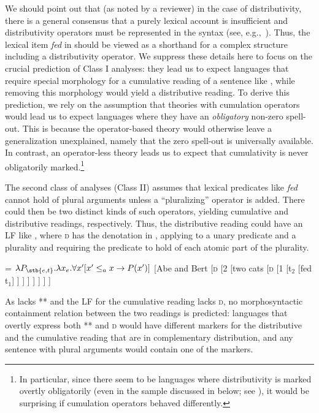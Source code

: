 \documentclass[output=paper]{langscibook}
\begin{document}
\noindent We should point out that (as noted by a reviewer) in the case of distributivity, there is a general consensus that a purely lexical account is insufficient and distributivity operators must be represented in the syntax (see, e.g.,~\citealt{Champollion:2015b}). Thus, the lexical item \textit{fed} in  should be viewed as a shorthand for a complex structure including a distributivity operator. We suppress these details here to focus on the crucial prediction of Class I analyses: they lead us to expect languages that require special morphology for a cumulative reading of a sentence like , while removing this morphology would yield a distributive reading. To derive this prediction, we rely on the assumption that theories with cumulation operators would lead us to expect languages where they have an \textit{obligatory} non-zero spell-out. This is because the operator-based theory would otherwise leave a generalization unexplained, namely that the zero spell-out is universally available. In contrast, an operator-less theory leads us to expect that cumulativity is never obligatorily marked.\footnote{In particular, since there seem to be languages where distributivity is marked overtly obligatorily (even in the sample discussed in  below; see \citealt{Flor:2017b, Flor:2017Distributive}), it would be surprising if cumulation operators behaved differently.}

The second class of analyses (Class II) assumes that lexical predicates like \textit{fed} cannot hold of plural arguments unless a ``pluralizing'' operator is added. There could then be two distinct kinds of such operators, yielding cumulative and distributive readings, respectively. Thus, the distributive reading could have an LF like , where \textsc{d} has the denotation in , applying to a unary predicate and a plurality and requiring the predicate to hold of each atomic part of the plurality. 

\ea 
\ea \label{has-sch:14a}  = $\lambda P_{\stb{e, t}}.\lambda x_e.\forall x'[x' \leq_a x \rightarrow P(x')]$
\ex \label{has-sch:14b} {[Abe and Bert [\textsc{d} [2 [two cats [\textsc{d} [1 [t$_2$ [fed t$_1$] ] ] ] ] ] ] ]} \z\z

\noindent As  lacks ** and the LF for the cumulative reading lacks \textsc{d}, no morphosyntactic containment relation between the two readings is predicted: languages that overtly express both ** and \textsc{d} would have different markers for the distributive and the cumulative reading that are in complementary distribution, and any sentence with plural arguments would contain one of the markers.
\end{document}
